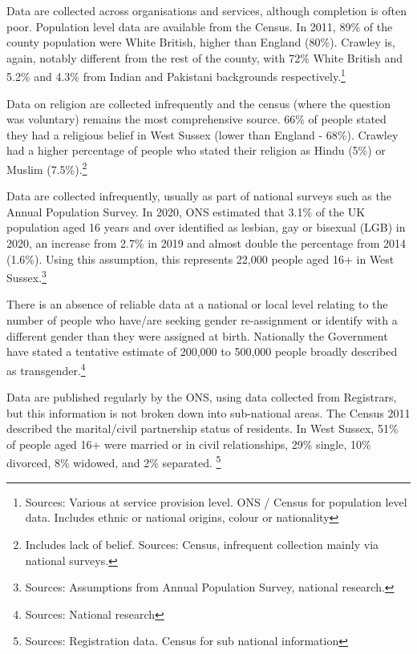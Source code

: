 \begin{tcolorbox}[title={Race}, colback={boxcolour}]
    \small Data are collected across organisations and services, although completion is often poor. Population level data are available from the Census. In 2011, 89\% of the county population were White British, higher than England (80\%). Crawley is, again, notably different from the rest of the county, with 72\% White British and 5.2\% and 4.3\% from Indian and Pakistani backgrounds respectively.\footnote{Sources: Various at service provision level. ONS / Census for population level data. Includes ethnic or national origins, colour or nationality}
\end{tcolorbox}
\begin{tcolorbox}[title={Religion and Belief}, colback={boxcolour}]
    \small Data on religion are collected infrequently and the census (where the question was voluntary) remains the most comprehensive source. 66\% of people stated they had a religious belief in West Sussex (lower than England - 68\%). Crawley had a higher percentage of people who stated their religion as Hindu (5\%) or Muslim (7.5\%).\footnote{Includes lack of belief. Sources: Census, infrequent collection mainly via national surveys.}
\end{tcolorbox}
\begin{tcolorbox}[title={Sexual Orientation}, colback={boxcolour}]
    \small Data are collected infrequently, usually as part of national surveys such as the Annual Population Survey. In 2020, ONS estimated that 3.1\% of the UK population aged 16 years and over identified as lesbian, gay or bisexual (LGB) in 2020, an increase from 2.7\% in 2019 and almost double the percentage from 2014 (1.6\%). Using this assumption, this represents 22,000 people aged 16+ in West Sussex.\footnote{Sources: Assumptions from Annual Population Survey, national research.}
\end{tcolorbox}
\begin{tcolorbox}[title={Gender re-assignation}, colback={boxcolour}]
    \small There is an absence of reliable data at a national or local level relating to the number of people who have/are seeking gender re-assignment or identify with a different gender than they were assigned at birth. Nationally the Government have stated a tentative estimate of 200,000 to 500,000 people broadly described as transgender.\footnote{Sources: National research}
\end{tcolorbox}
\begin{tcolorbox}[title={Marriage and civil partnerships}, colback={boxcolour}]
    \small Data are published regularly by the ONS, using data collected from Registrars, but this information is not broken down into sub-national areas. The Census 2011 described the marital/civil partnership status of residents. In West Sussex, 51\% of people aged 16+ were married or in civil relationships, 29\% single, 10\% divorced, 8\% widowed, and 2\% separated. \footnote{Sources: Registration data. Census for sub national information}
\end{tcolorbox}
